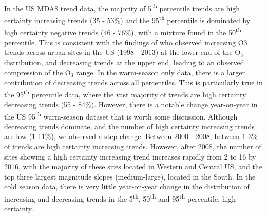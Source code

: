 \documentclass[journal abbreviation, manuscript]{copernicus}
\begin{document}
In the US MDA8 trend data, the majority of 5\textsuperscript{th} percentile trends are high certainty increasing trends (35 - 53\%) and the 95\textsuperscript{th} percentile is dominated by high certainty negative trends (46 - 76\%), with a mixture found in the 50\textsuperscript{th} percentile. This is consistent with the findings of \cite{Simon_2015} who observed increasing O3 trends across urban sites in the US (1998 - 2013) at the lower end of the O$_3$ distribution, and decreasing trends at the upper end, leading to an observed compression of the O$_3$ range. In the warm-season only data, there is a larger contribution of decreasing trends across all percentiles. This is particularly true in the 95\textsuperscript{th} percentile data, where the vast majority of trends are high certainty decreasing trends (55 - 84\%). However, there is a notable change year-on-year in the US 95\textsuperscript{th} warm-season dataset that is worth some discussion. Although decreasing trends dominate, and the number of high certainty increasing trends are low (1-11\%), we observed a step-change. Between 2000 - 2008, between 1-3\% of trends are high certainty increasing trends. However, after 2008, the number of sites showing a high certainty increasing trend increases rapidly from 2 to 16 by 2016, with the majority of these sites located in Western and Central US, and the top three largest magnitude slopes (medium-large), located in the South. In the cold season data, there is very little year-on-year change in the distribution of increasing and decreasing trends in the 5\textsuperscript{th}, 50\textsuperscript{th} and 95\textsuperscript{th} percentile. high certainty.
\end{document}
